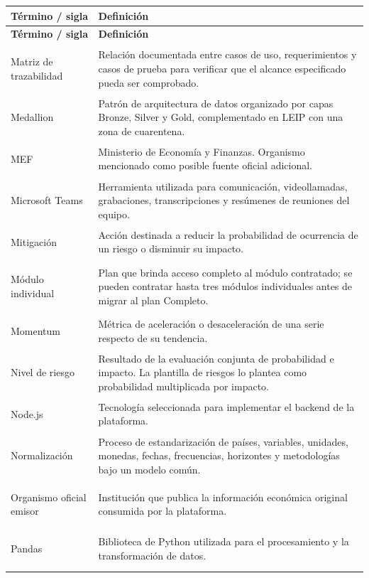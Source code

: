 \documentclass[11pt,a4paper]{article}
\makeatletter
\newcommand{\proyectoNombre}{LEIP}
\newenvironment{glosario}{%
  \renewcommand{\arraystretch}{1.18}%
  \begin{longtable}{@{}>{\raggedright\arraybackslash\bfseries}p{4.0cm} >{\raggedright\arraybackslash}p{10.7cm}@{}}
  \toprule
  \textbf{T\'ermino / sigla} & \textbf{Definici\'on} \\
  \midrule
  \endfirsthead
  \toprule
  \textbf{T\'ermino / sigla} & \textbf{Definici\'on} \\
  \midrule
  \endhead
  \bottomrule
  \endfoot
}{%
  \end{longtable}
  \renewcommand{\arraystretch}{1}%
}
\makeatother
\begin{document}
\begin{glosario}
Matriz de trazabilidad & Relaci\'on documentada entre casos de uso, requerimientos y casos de prueba para verificar que el alcance especificado pueda ser comprobado. \\
\addlinespace

Medallion & Patr\'on de arquitectura de datos organizado por capas Bronze, Silver y Gold, complementado en \proyectoNombre{} con una zona de cuarentena. \\
\addlinespace

MEF & Ministerio de Econom\'ia y Finanzas. Organismo mencionado como posible fuente oficial adicional. \\
\addlinespace

Microsoft Teams & Herramienta utilizada para comunicaci\'on, videollamadas, grabaciones, transcripciones y res\'umenes de reuniones del equipo. \\
\addlinespace

Mitigaci\'on & Acci\'on destinada a reducir la probabilidad de ocurrencia de un riesgo o disminuir su impacto. \\
\addlinespace

M\'odulo individual & Plan que brinda acceso completo al m\'odulo contratado; se pueden contratar hasta tres m\'odulos individuales antes de migrar al plan Completo. \\
\addlinespace

Momentum & M\'etrica de aceleraci\'on o desaceleraci\'on de una serie respecto de su tendencia. \\
\addlinespace

Nivel de riesgo & Resultado de la evaluaci\'on conjunta de probabilidad e impacto. La plantilla de riesgos lo plantea como probabilidad multiplicada por impacto. \\
\addlinespace

Node.js & Tecnolog\'ia seleccionada para implementar el backend de la plataforma. \\
\addlinespace

Normalizaci\'on & Proceso de estandarizaci\'on de pa\'ises, variables, unidades, monedas, fechas, frecuencias, horizontes y metodolog\'ias bajo un modelo com\'un. \\
\addlinespace

Organismo oficial emisor & Instituci\'on que publica la informaci\'on econ\'omica original consumida por la plataforma. \\
\addlinespace

Pandas & Biblioteca de Python utilizada para el procesamiento y la transformaci\'on de datos. \\
\addlinespace


\end{glosario}
\end{document}
